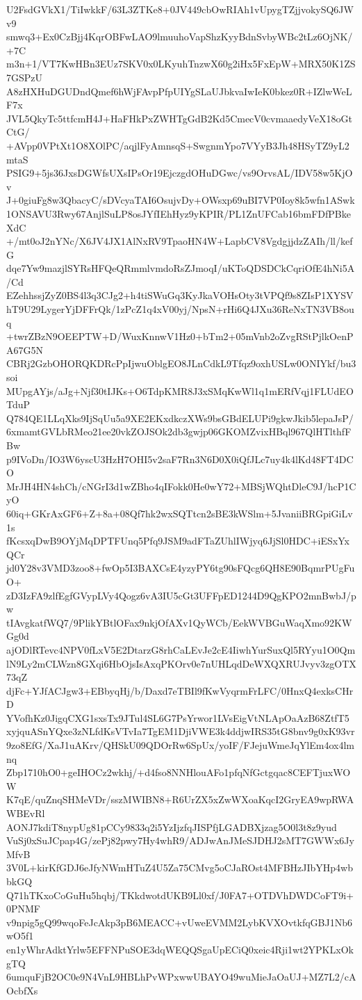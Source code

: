 U2FsdGVkX1/TiIwkkF/63L3ZTKe8+0JV449cbOwRIAh1vUpygTZjjvokySQ6JWv9
smwq3+Ex0CzBjj4KqrOBFwLAO9lmuuhoVapShzKyyBdnSvbyWBc2tLz6OjNK/+7C
m3n+1/VT7KwHBn3EUz7SKV0x0LKyuhTnzwX60g2iHx5FxEpW+MRX50K1ZS7GSPzU
A8zHXHuDGUDndQmef6hWjFAvpPfpUIYgSLaUJbkvaIwIeK0bkez0R+IZlwWeLF7x
JVL5QkyTc5ttfcmH4J+HaFHkPxZWHTgGdB2Kd5CmecV0cvmaaedyVeX18oGtCtG/
+AVpp0VPtXt1O8XOlPC/aqjlFyAmnsqS+SwgnmYpo7VYyB3Jh48HSyTZ9yL2mtaS
PSIG9+5js36JxsDGWfsUXsIPsOr19EjczgdOHuDGwc/vs9OrvsAL/IDV58w5KjOv
J+0giuFg8w3QbacyC/sDVcyaTAI6OsujvDy+OWsxp69uBI7VP0Ioy8k5wfn1ASwk
1ONSAVU3Rwy67AnjlSuLP8osJYfIEhHyz9yKPIR/PL1ZnUFCab16bmFDfPBkeXdC
+/mt0oJ2nYNc/X6JV4JX1AlNxRV9TpaoHN4W+LapbCV8VgdgjjdzZAIh/ll/kefG
dqe7Yw9mazjlSYRsHFQeQRmmlvmdoRsZJmoqI/uKToQDSDCkCqriOfE4hNi5A/Cd
EZehhssjZyZ0BS4l3q3CJg2+h4tiSWuGq3KyJkaVOHsOty3tVPQf9s8ZIsP1XYSV
hT9U29LygerYjDFFrQk/1zPcZ1q4xV00yj/NpsN+rHi6Q4JXu36ReNxTN3VB8ouq
+twrZBzN9OEEPTW+D/WuxKnnwV1Hz0+bTm2+05mVnb2oZvgRStPjlkOenPA67G5N
CBRj2GzbOHORQKDRcPpIjwuOblgEO8JLnCdkL9Tfqz9oxhUSLw0ONIYkf/bu3soi
MUpgAYjs/aJg+Njf30tIJKs+O6TdpKMR8J3xSMqKwWl1q1mERfVqj1FLUdEOTduP
Q784QE1LLqXks9IjSqUu5a9XE2EKxdkczXWs9bsGBdELUPi9gkwJkib5lepaJsP/
6xmamtGVLbRMeo21ee20vkZOJSOk2db3gwjp06GKOMZvixHBql967QlHTlthfFBw
p9IVoDn/IO3W6yscU3HzH7OHI5v2saF7Rn3N6D0X0iQfJLc7uy4k4lKd48FT4DCO
MrJH4HN4shCh/cNGrI3d1wZBho4qIFokk0He0wY72+MBSjWQhtDleC9J/hcP1CyO
60iq+GKrAxGF6+Z+8a+08Qf7hk2wxSQTtcn2sBE3kWSlm+5JvaniiBRGpiGiLv1s
fKcsxqDwB9OYjMqDPTFUnq5Pfq9JSM9adFTaZUhlIWjyq6JjSl0HDC+iESxYxQCr
jd0Y28v3VMD3zoo8+fwOp5I3BAXCsE4yzyPY6tg90sFQcg6QH8E90BqmrPUgFuO+
zD3IzFA9zlfEgfGVypLVy4Qogz6vA3IU5cGt3UFFpED1244D9QgKPO2mnBwbJ/pw
tIAvgkatfWQ7/9PlikYBtlOFax9nkjOfAXv1QyWCb/EekWVBGuWaqXmo92KWGg0d
ajODlRTevc4NPV0fLxV5E2DtarzG8rhCaLEvJe2cE4IiwhYurSuxQl5RYyu1O0Qm
lN9Ly2mCLWzn8GXqi6HbOjsIsAxqPKOrv0e7nUHLqdDeWXQXRUJvyv3zgOTX73qZ
djFc+YJfACJgw3+EBbyqHj/b/Daxd7eTBIl9fKwVyqrmFrLFC/0HnxQ4exksCHrD
YVofhKz0JigqCXG1sxsTx9JTul4SL6G7PsYrwor1LVsEigVtNLApOaAzB68ZtfT5
xyjquASnYQxe3zNLfdKsVTvIa7TgEM1DjiVWE3k4ddjwIRS35tG8bnv9g0xK93vr
9zo8EfG/XaJ1uAKrv/QHSkU09QDOrRw6SpUx/yoIF/FJejuWmeJqYlEm4ox4lmnq
Zbp1710hO0+geIHOCz2wkhj/+d4fso8NNHlouAFo1pfqNfGctgqac8CEFTjuxWOW
K7qE/quZnqSHMeVDr/sszMWIBN8+R6UrZX5xZwWXoaKqcI2GryEA9wpRWAWBEvRl
AONJ7kdiT8nypUg81pCCy9833q2i5YzIjzfqJISPfjLGADBXjzag5O0l3t8z9yud
VuSj0xSuJCpap4G/zePj82pwy7Hy4whR9/ADJwAnJMeSJDHJ2sMT7GWWx6JyMfvB
3V0L+kirKfGDJ6eJfyNWmHTuZ4U5Za75CMvg5oCJaROst4MFBHzJIbYHp4wbbkGQ
Q71hTKxoCoGuHu5hqbj/TKkdwotdUKB9Ll0xf/J0FA7+OTDVhDWDCoFT9i+0PNMF
v9npig5gQ99wqoFeJcAkp3pB6MEACC+vUweEVMM2LybKVXOvtkfqGBJ1Nb6wO5f1
en1yWhrAdktYrlw5EFFNPuSOE3dqWEQQSgaUpECiQ0xeic4Rji1wt2YPKLxOkgTQ
6umquFjB2OC0e9N4VnL9HBLhPvWPxwwUBAYO49wuMieJaOaUJ+MZ7L2/cAOcbfXs
